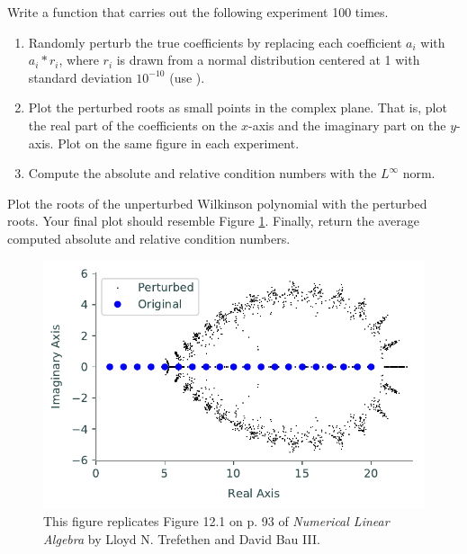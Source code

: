 \begin{problem}\label{prob:wilk}
Write a function that carries out the following experiment 100 times.
\begin{enumerate}
\item Randomly perturb the true coefficients by replacing each coefficient $a_i$ with $a_i*r_i$, where $r_i$ is drawn from a normal distribution centered at 1 with standard deviation $10^{-10}$ (use ).
\item Plot the perturbed roots as small points in the complex plane.
That is, plot the real part of the coefficients on the $x$-axis and the imaginary part on the $y$-axis.
Plot on the same figure in each experiment.
\item Compute the absolute and relative condition numbers with the $L^{\infty}$ norm.
\end{enumerate}
Plot the roots of the unperturbed Wilkinson polynomial with the perturbed roots.
Your final plot should resemble Figure \ref{fig:wilkinsonpolynomial_many}.
Finally, return the average computed absolute and relative condition numbers.

\begin{figure}[H]
\includegraphics[width=.7\linewidth]{figures/wilkinson_prob_solution.pdf}
\caption{
This figure replicates Figure 12.1 on p. 93 of \emph{Numerical Linear Algebra} by Lloyd N. Trefethen and David Bau III.}
\label{fig:wilkinsonpolynomial_many}
\end{figure}
\end{problem}



